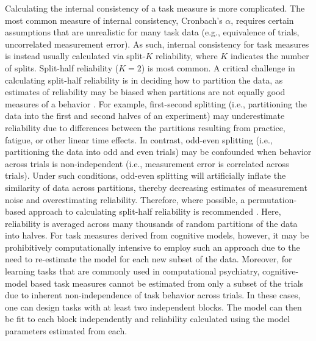 \documentclass[a4paper,12pt]{article}
\begin{document}
Calculating the internal consistency of a task measure is more complicated. The most common measure of internal consistency, Cronbach's $\alpha$, requires certain assumptions that are unrealistic for many task data (e.g., equivalence of trials, uncorrelated measurement error). As such, internal consistency for task measures is instead usually calculated via split-$K$ reliability, where $K$ indicates the number of splits. Split-half reliability ($K=2$) is most common. A critical challenge in calculating split-half reliability is in deciding how to partition the data, as estimates of reliability may be biased when partitions are not equally good measures of a behavior \cite{Green2016-xw, pronk2022can}. For example, first-second splitting (i.e., partitioning the data into the first and second halves of an experiment) may underestimate reliability due to differences between the partitions resulting from practice, fatigue, or other linear time effects. In contrast, odd-even splitting (i.e., partitioning the data into odd and even trials) may be confounded when behavior across trials is non-independent (i.e., measurement error is correlated across trials). Under such conditions, odd-even splitting will artificially inflate the similarity of data across partitions, thereby decreasing estimates of measurement noise and overestimating reliability. Therefore, where possible, a permutation-based approach to calculating split-half reliability is recommended \cite{pronk2022can, Parsons2019-jw}. Here, reliability is averaged across many thousands of random partitions of the data into halves. For task measures derived from cognitive models, however, it may be prohibitively computationally intensive to employ such an approach due to the need to re-estimate the model for each new subset of the data. Moreover, for learning tasks that are commonly used in computational psychiatry, cognitive-model based task measures cannot be estimated from only a subset of the trials due to inherent non-independence of task behavior across trials. In these cases, one can design tasks with at least two independent blocks. The model can then be fit to each block independently and reliability calculated using the model parameters estimated from each. 
\end{document}
